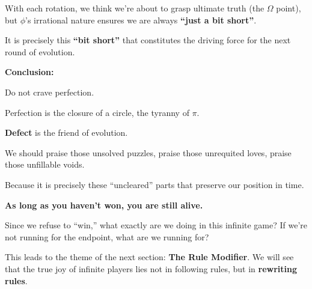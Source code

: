 With each rotation, we think we're about to grasp ultimate truth (the $\Omega$ point), but $\phi$'s irrational nature ensures we are always \textbf{``just a bit short''}.

It is precisely this \textbf{``bit short''} that constitutes the driving force for the next round of evolution.

\textbf{Conclusion:}

Do not crave perfection.

Perfection is the closure of a circle, the tyranny of $\pi$.

\textbf{Defect} is the friend of evolution.

We should praise those unsolved puzzles, praise those unrequited loves, praise those unfillable voids.

Because it is precisely these ``uncleared'' parts that preserve our position in time.

\textbf{As long as you haven't won, you are still alive.}

Since we refuse to ``win,'' what exactly are we doing in this infinite game? If we're not running for the endpoint, what are we running for?

This leads to the theme of the next section: \textbf{The Rule Modifier}. We will see that the true joy of infinite players lies not in following rules, but in \textbf{rewriting rules}.

